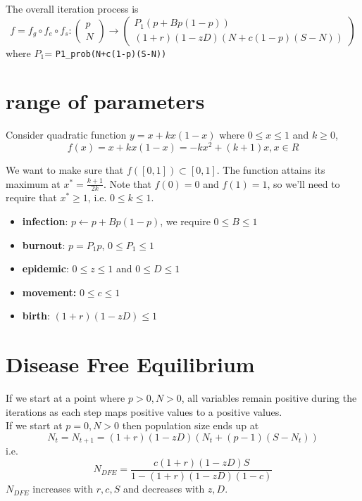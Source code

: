 \documentclass[12pt]{article}
\begin{document}
The overall iteration process is
$$f=f_g\circ f_e\circ f_s:\begin{pmatrix}
    p\\N
\end{pmatrix}
\to \begin{pmatrix}
    P_1(p+Bp(1-p))\\
    (1+r)(1-zD)(N+c(1-p)(S-N))
\end{pmatrix}$$
where 
$P_1$=
\lstinline {P1_prob(N+c(1-p)(S-N))}
    
\section{range of parameters}
Consider quadratic function $y=x+kx(1-x)$ where $0\leq x\leq 1$ and $k\geq 0$,
$$f(x)=x+kx(1-x)=-kx^2+(k+1)x, x \in R $$

We want to make sure that $f([0,1])\subset [0,1]$. The function attains its maximum at $x^*=\frac{k+1}{2k}$. Note that $f(0)=0$ and $f(1)=1$, so we'll need to require that $x^*\geq1$, i.e. $0\leq k\leq1$. \\
\begin{itemize}
    \item \textbf{infection}:  $p\leftarrow p+Bp(1-p)$, we require $0\leq B\leq1$
    \item \textbf{burnout}: $p=P_1p$, $0\leq P_1 \leq 1$
    \item \textbf{epidemic}: $0\leq z \leq1$ and $0\leq D \leq 1$
    \item \textbf{movement:} $0\leq c \leq 1$
    \item \textbf{birth}:  $(1+r)(1-zD)\leq 1$
\end{itemize}

\section{Disease Free Equilibrium}
If we start at a point where $p>0,N>0$, all variables remain positive during the iterations as each step maps positive values to a positive values. \\
If we start at $p=0,N>0$  then population size ends up at  
$$
N_t=N_{t+1}=(1+r)(1-zD)(N_t+(p-1)(S-N_t))
$$
i.e.
$$N_{DFE}=\frac{c(1+r)(1-zD)S}{1-(1+r)(1-zD)(1-c)}$$
$N_{DFE}$ increases with $r,c,S$ and decreases with $z,D$.
\end{document}
